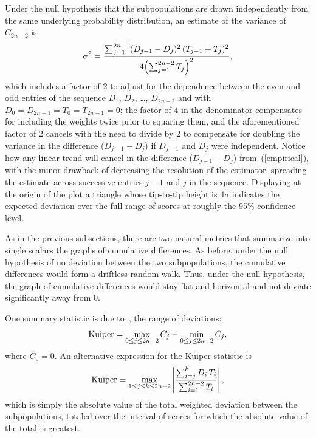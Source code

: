 \documentclass[]{fairmeta}
\begin{document}
Under the null hypothesis that the subpopulations are drawn
independently from the same underlying probability distribution,
an estimate of the variance of $C_{2n-2}$ is
%
\begin{equation}
\label{empirical}
\sigma^2 = \frac{\sum_{j=1}^{2n-1} (D_{j-1} - D_j)^2 \, (T_{j-1} + T_j)^2}
                {4 \Bigl( \sum_{j=1}^{2n-2} T_j \Bigr)^2},
\end{equation}
%
which includes a factor of 2 to adjust for the dependence between
the even and odd entries of the sequence $D_1$, $D_2$, \dots, $D_{2n-2}$
and with $D_0 = D_{2n-1} = T_0 = T_{2n-1} = 0$;
the factor of 4 in the denominator compensates for including the weights
twice prior to squaring them, and the aforementioned factor of 2
cancels with the need to divide by 2 to compensate
for doubling the variance in the difference ($D_{j-1} - D_j$)
if $D_{j-1}$ and $D_j$ were independent.
Notice how any linear trend will cancel in the difference ($D_{j-1} - D_j$)
from~(\ref{empirical}), with the minor drawback of decreasing the resolution
of the estimator, spreading the estimate across successive entries
$j-1$ and $j$ in the sequence.
Displaying at the origin of the plot a triangle whose tip-to-tip height
is $4\sigma$ indicates the expected deviation over the full range of scores
at roughly the 95\% confidence level.

As in the previous subsections, there are two natural metrics
that summarize into single scalars the graphs of cumulative differences.
As before, under the null hypothesis of no deviation
between the two subpopulations,
the cumulative differences would form a driftless random walk.
Thus, under the null hypothesis, the graph of cumulative differences
would stay flat and horizontal and not deviate significantly away from 0.

One summary statistic is due to~\cite{kuiper}, the range of deviations:
%
\begin{equation}
{\rm Kuiper} = \max_{0 \le j \le 2n-2} C_j - \min_{0 \le j \le 2n-2} C_j,
\end{equation}
%
where $C_0 = 0$.
An alternative expression for the Kuiper statistic is
%
\begin{equation}
\label{intuitive_subpops}
{\rm Kuiper} = \max_{1 \le j \le k \le 2n-2}
\left| \frac{\sum_{i=j}^k D_i \, T_i}{\sum_{i=1}^{2n-2} T_i} \right|,
\end{equation}
%
which is simply the absolute value of the total weighted deviation
between the subpopulations,
totaled over the interval of scores for which the absolute value
of the total is greatest.
\end{document}
